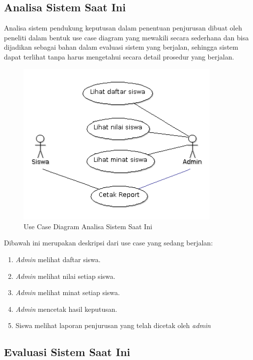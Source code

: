 \subsection{Analisa Sistem Saat Ini}
Analisa sistem pendukung keputusan dalam penentuan penjurusan dibuat oleh peneliti dalam bentuk use case diagram yang mewakili secara sederhana dan bisa dijadikan sebagai bahan dalam evaluasi sistem yang berjalan, sehingga sistem dapat terlihat tanpa harus mengetahui secara detail prosedur yang berjalan.
\begin{figure}[ht]
	\centering
	\includegraphics[width=10cm]{images/UseCaseDiagramSistemSaatIni}
	\caption{Use Case Diagram Analisa Sistem Saat Ini}
\end{figure}

\newpage
\noindent Dibawah ini merupakan deskripsi dari use case yang sedang berjalan:
\begin{enumerate}[nolistsep,leftmargin=0.5cm]
\item \textit{Admin} melihat daftar siswa.
\item \textit{Admin} melihat nilai setiap siswa.
\item \textit{Admin} melihat minat setiap siswa.
\item \textit{Admin} mencetak hasil keputusan.
\item Siswa melihat laporan penjurusan yang telah dicetak oleh \textit{admin}
\end{enumerate}

\subsection{Evaluasi Sistem Saat Ini}

